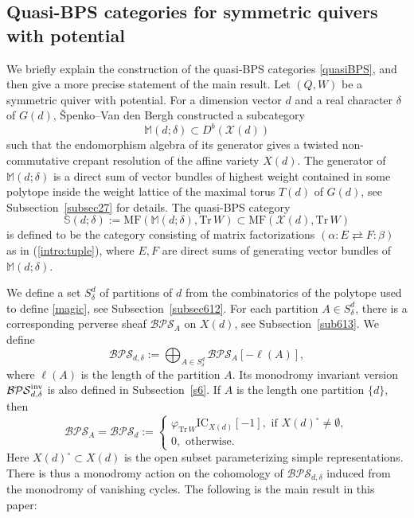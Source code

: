 \documentclass [11pt,oneside,a4paper,mathscr]{amsart}
\theoremstyle{definition}
\newcommand{\X}{\mathscr{X}}
\begin{document}
\subsection{Quasi-BPS categories for symmetric quivers with potential}\label{sub14}

We briefly explain the construction of the quasi-BPS categories \eqref{quasiBPS}, and then give a
more precise statement of the main result. 
Let $(Q, W)$ be a symmetric quiver with potential. 
For a dimension vector $d$
and a real character $\delta$ of $G(d)$, \v{S}penko--Van den Bergh \cite{SVdB} constructed 
a subcategory 
\begin{equation}\label{magic}
\mathbb{M}(d; \delta)\subset D^b(\X(d))
\end{equation}
such that the endomorphism algebra of its generator 
gives a twisted non-commutative crepant resolution of the 
affine variety $X(d)$. 
The generator of $\mathbb{M}(d; \delta)$ is a direct sum of vector bundles 
of highest weight contained in 
some polytope inside the weight lattice of the maximal torus $T(d)$ of $G(d)$, see Subsection~\ref{subsec27} 
for details. 
The quasi-BPS category 
\[\mathbb{S}(d; \delta):=\mathrm{MF}(\mathbb{M}(d; \delta), \mathrm{Tr}\,W)\subset \mathrm{MF}(\X(d), \mathrm{Tr}\,W)\] is defined 
to be the category consisting 
of matrix factorizations $(\alpha \colon E\rightleftarrows F \colon \beta)$
as in (\ref{intro:tuple}), where $E, F$ are direct sums of generating vector bundles of $\mathbb{M}(d; \delta)$.

We define a set $S^d_{\delta}$ of partitions of $d$ from the combinatorics of the polytope used to define \eqref{magic}, see Subsection~\ref{subsec612}.
For each partition $A\in S^d_{\delta}$, there is a corresponding perverse sheaf $\mathcal{BPS}_A$
on $X(d)$, see Subsection~\ref{sub613}. We define 
\begin{equation}\label{def:BPSsheafdw}
\mathcal{BPS}_{d,\delta}:=\bigoplus_{A\in S^d_\delta}\mathcal{BPS}_A[-\ell(A)],
\end{equation}
where $\ell(A)$ is the length of the partition $A$. 
Its monodromy invariant version $\mathcal{BPS}_{d, \delta}^{\rm{inv}}$ is 
also defined in Subsection~\ref{s6}. 
If $A$ is 
the length one partition $\{d\}$, then 
\begin{equation}\label{BPSequ}
\mathcal{BPS}_{A}=\mathcal{BPS}_d:=\begin{cases}
\varphi_{\mathrm{Tr}\,W}\mathrm{IC}_{X(d)}[-1],\text{ if }X(d)^{\circ}\neq \emptyset,\\0, \text{ otherwise}.
\end{cases}
\end{equation}
Here $X(d)^{\circ} \subset X(d)$ is the open subset 
parameterizing simple representations. 
There is thus a monodromy action on the cohomology of $\mathcal{BPS}_{d, \delta}$  induced from the monodromy of vanishing cycles.
The following is the main result in this paper: 
\end{document}
